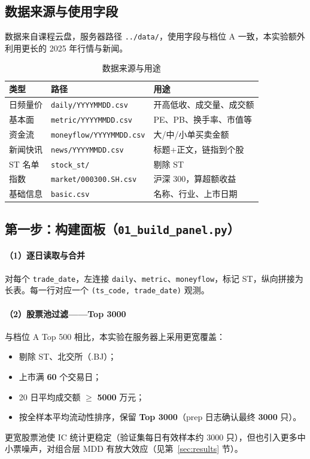 \documentclass[UTF8,a4paper,12pt]{ctexart}
\begin{document}
\subsection{数据来源与使用字段}

数据来自课程云盘，服务器路径 \texttt{../data/}，使用字段与档位 A 一致，本实验额外利用更长的 2025 年行情与新闻。

\begin{table}[H]
\centering
\caption{数据来源与用途}
\label{tab:data}
\begin{tabular}{llp{5.2cm}}
\toprule
\textbf{类型} & \textbf{路径} & \textbf{用途} \\
\midrule
日频量价   & \texttt{daily/YYYYMMDD.csv}   & 开高低收、成交量、成交额 \\
基本面     & \texttt{metric/YYYYMMDD.csv}    & PE、PB、换手率、市值等 \\
资金流     & \texttt{moneyflow/YYYYMMDD.csv} & 大/中/小单买卖金额 \\
新闻快讯   & \texttt{news/YYYYMMDD.csv}      & 标题+正文，链指到个股 \\
ST 名单    & \texttt{stock\_st/}             & 剔除 ST \\
指数       & \texttt{market/000300.SH.csv}   & 沪深 300，算超额收益 \\
基础信息   & \texttt{basic.csv}              & 名称、行业、上市日期 \\
\bottomrule
\end{tabular}
\end{table}

\subsection{第一步：构建面板（\texttt{01\_build\_panel.py}）}

\paragraph{（1）逐日读取与合并}

对每个 \texttt{trade\_date}，左连接 \texttt{daily}、\texttt{metric}、\texttt{moneyflow}，标记 ST，纵向拼接为长表。每一行对应一个 \texttt{(ts\_code, trade\_date)} 观测。

\paragraph{（2）股票池过滤——Top 3000}

与档位 A Top 500 相比，本实验在服务器上采用更宽覆盖：
\begin{itemize}[leftmargin=2em]
  \item 剔除 ST、北交所（.BJ）；
  \item 上市满 \textbf{60} 个交易日；
  \item 20 日平均成交额 $\geq$ \textbf{5000} 万元；
  \item 按全样本平均流动性排序，保留 \textbf{Top 3000}（prep 日志确认最终 \textbf{3000} 只）。
\end{itemize}
更宽股票池使 IC 统计更稳定（验证集每日有效样本约 3000 只），但也引入更多中小票噪声，对组合层 MDD 有放大效应（见第~\ref{sec:results} 节）。
\end{document}
